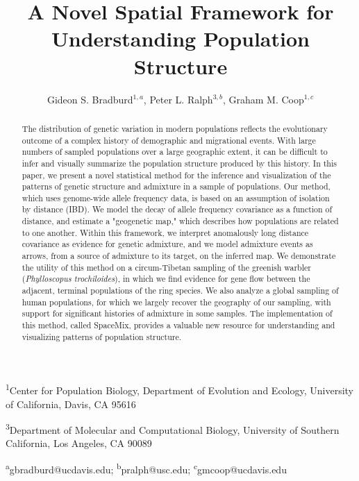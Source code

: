 \documentclass[12pt]{article}
\title{A Novel Spatial Framework for Understanding Population Structure}
\date{\vspace{-5ex}}
\author{Gideon S. Bradburd$^{1,a}$, Peter L. Ralph$^{3,b}$, Graham M. Coop$^{1,c}$}
\begin{document}
\maketitle

\textsuperscript{1}Center for Population Biology, Department of Evolution and Ecology, University of California, Davis, CA 95616

\textsuperscript{3}Department of Molecular and Computational Biology, University of Southern California, Los Angeles, CA 90089

\textsuperscript{a}gbradburd@ucdavis.edu; 
\textsuperscript{b}pralph@usc.edu;
\textsuperscript{c}gmcoop@ucdavis.edu\\\\\

\newpage

\begin{abstract}
The distribution of genetic variation in modern populations reflects the evolutionary outcome of a complex history of demographic and migrational events.  With large numbers of sampled populations over a large geographic extent, it can be difficult to infer and visually summarize the population structure produced by this history.  In this paper, we present a novel statistical method for the inference and visualization of the patterns of genetic structure and admixture in a sample of populations.  Our method, which uses genome-wide allele frequency data, is based on an assumption of isolation by distance (IBD).  We model the decay of allele frequency covariance as a function of distance, and estimate a "geogenetic map," which describes how populations are related to one another.  Within this framework, 
we interpret anomalously long distance covariance as evidence for genetic admixture, and we model admixture events as arrows, from a source of admixture to its target, on the inferred map.  We demonstrate the utility of this method on a circum-Tibetan sampling of the greenish warbler (\textit{Phylloscopus trochiloides}), in which we find evidence for gene flow between the adjacent, terminal populations of the ring species.  We also analyze a global sampling of human populations, for which we largely recover the geography of our sampling, with support for significant histories of admixture in some samples.  The implementation of this method, called SpaceMix, provides a valuable new resource for understanding and visualizing patterns of population structure.
\end{abstract}
\end{document}
